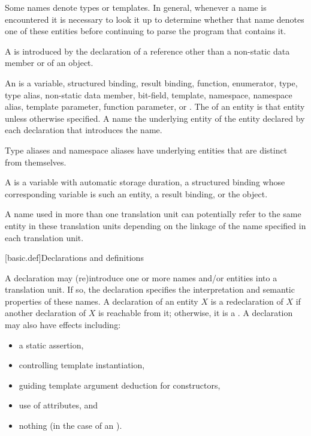 \pnum
\begin{note}
Some names denote types or templates.
In general, whenever a name is encountered
it is necessary to look it up
to determine whether that name denotes one of these entities
before continuing to parse the program that contains it.
\end{note}

\pnum
A  is introduced by the
declaration of
a reference other than a non-static data member or of
an object.

\pnum
An  is a
variable,
structured binding,
result binding,
function,
enumerator,
type,
type alias,
non-static data member,
bit-field,
template,
namespace,
namespace alias,
template parameter,
function parameter, or
.
The  of an entity is that entity
unless otherwise specified.
A name  the underlying entity of
the entity declared by each declaration that introduces the name.
\begin{note}
Type aliases and namespace aliases have underlying entities
that are distinct from themselves.
\end{note}

\pnum
A  is a variable with
automatic storage duration,
a structured binding
whose corresponding variable is such an entity,
a result binding,
or the  object.

\pnum
{}%
%
A name used in more than one translation unit can potentially
refer to the same entity in these translation units depending on the
linkage of the name specified in each
translation unit.

[basic.def]{Declarations and definitions}

\pnum
{}%
%
%
A declaration may (re)introduce
one or more names and/or entities into a translation
unit.
If so, the
declaration specifies the interpretation and semantic properties of these names.
A declaration of an entity $X$ is
a redeclaration of $X$
if another declaration of $X$ is reachable from it;
otherwise, it is a .
A declaration may also have effects including:
\begin{itemize}
\item a static assertion,
\item controlling template instantiation,
\item guiding template argument deduction for constructors,
\item use of attributes, and
\item nothing (in the case of an ).
\end{itemize}

